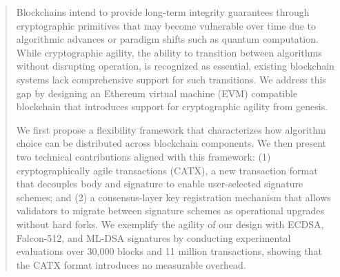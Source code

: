 \begin{abstract}
    Blockchains intend to provide long-term integrity guarantees through cryptographic primitives that may become vulnerable over time due to algorithmic advances or paradigm shifts such as quantum computation.
    While cryptographic agility, the ability to transition between algorithms without disrupting operation, is recognized as essential, existing blockchain systems lack comprehensive support for such transitions.
    We address this gap by designing an Ethereum virtual machine (EVM) compatible blockchain that introduces support for cryptographic agility from genesis.
    
    We first propose a flexibility framework that characterizes how algorithm choice can be distributed across blockchain components.
    We then present two technical contributions aligned with this framework: (1) cryptographically agile transactions (CATX), a new transaction format that decouples body and signature to enable user-selected signature schemes; and (2) a consensus-layer key registration mechanism that allows validators to migrate between signature schemes as operational upgrades without hard forks.
    We exemplify the agility of our design with ECDSA, Falcon-512, and ML-DSA signatures by conducting experimental evaluations over 30,000 blocks and 11 million transactions, showing that the CATX format introduces no measurable overhead.
    
\end{abstract}